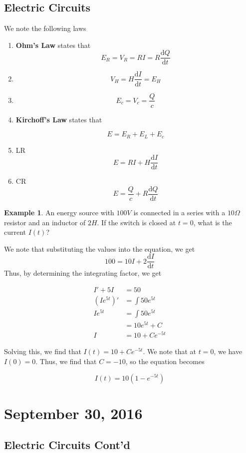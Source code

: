 \documentclass[11pt]{article}
\theoremstyle{plain} %
\theoremstyle{definition}
\theoremstyle{example}
\newtheorem*{example}{Example}
\theoremstyle{remark}
\begin{document}
\subsection{Electric Circuits}
We note the following laws

\begin{enumerate}

\item \textbf{Ohm's Law} states that $$E_R = V_R = RI = R\frac{\mathrm d Q}{\mathrm d t}$$


\item $$V_H = H\frac{\mathrm d I}{\mathrm d t} = E_H$$
\item $$E_c = V_c = \frac{Q}{c}$$

\item \textbf{Kirchoff's Law} states that 

$$E = E_R + E_L + E_c$$ 
\item LR	$$ E=RI + H\frac{\mathrm d I}{\mathrm d t}$$
\item CR$$ E = \frac{Q}{c} + R\frac{\mathrm d Q}{\mathrm d t}$$
\end{enumerate}


\begin{example}
An energy source with $100 V$ is connected in a series with a $10\Omega$ resistor and an inductor of $2H$. If the switch is closed at $t=0$, what is the current $I(t)$?
\end{example}

We note that substituting the values into the equation, we get $$100=10I+2\frac{\mathrm d I}{\mathrm d t}$$
Thus, by determining the integrating factor, we get

\begin{align*}
I' +5I &= 50\\
\left(Ie^{5t}\right)' &= \int 50e^{5t}\\
Ie^{5t} &= \int 50e^{5t}\\
&= 10e^{5t} + C\\
I &= 10+Ce^{-5t}
\end{align*}

Solving this, we find that $I(t) = 10 + Ce^{-5t}$. We note that at $t=0$, we have $I(0) = 0$. Thus, we find that $C=-10$, so the equation becomes 

$$I(t) = 10\left(1-e^{-5t}\right)$$

\section{September 30, 2016}
\subsection{Electric Circuits Cont'd}
\end{document}
